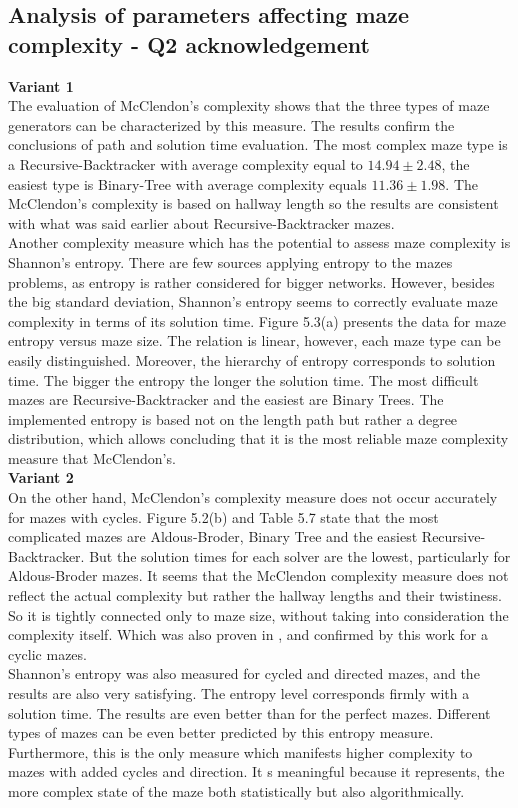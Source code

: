 \subsection{Analysis of parameters affecting maze complexity - Q2 acknowledgement}
\textbf{Variant 1}\\
\indent The evaluation of McClendon's complexity shows that the three types of maze generators can be characterized by this measure. The results confirm the conclusions
of path and solution time evaluation. The most complex maze type is a Recursive-Backtracker with average complexity equal to $14.94 \pm 2.48$, the easiest type is 
Binary-Tree with average complexity equals $11.36 \pm 1.98$. The McClendon's complexity is based on hallway length so the results are consistent with what was said earlier about
Recursive-Backtracker mazes.\\
Another complexity measure which has the potential to assess maze complexity is Shannon's entropy. There are few sources applying entropy to the mazes problems,
as entropy is rather considered for bigger networks. However, besides the big standard deviation, Shannon's entropy seems to correctly evaluate maze complexity
in terms of its solution time. Figure 5.3(a) presents the data for maze entropy versus maze size. The relation is linear, however, each maze type can be easily distinguished.
Moreover, the hierarchy of entropy corresponds to solution time. The bigger the entropy the longer the solution time. The most difficult mazes are Recursive-Backtracker and 
the easiest are Binary Trees. The implemented entropy is based not on the length path but rather a degree distribution, which allows concluding that it is the most reliable 
maze complexity measure that McClendon's.\\
\textbf{Variant 2}\\
On the other hand, McClendon's complexity measure does not occur accurately for mazes with cycles. Figure 5.2(b) and Table 5.7 state that the most
complicated mazes are Aldous-Broder, Binary Tree and the easiest Recursive-Backtracker. But the solution times for each solver are the lowest, particularly for 
Aldous-Broder mazes. It seems that the McClendon complexity measure does not reflect the actual complexity but rather the hallway lengths and their twistiness. So it
is tightly connected only to maze size, without taking into consideration the complexity itself.
Which was also proven in \cite{4}, and confirmed by this work for a cyclic mazes.\\
Shannon's entropy was also measured for cycled and directed mazes, and the results are also very satisfying. The entropy level corresponds firmly with a solution time.
The results are even better than for the perfect mazes. Different types of mazes can be even better predicted by this entropy measure.
Furthermore, this is the only measure which manifests higher complexity to mazes with added cycles and direction. It s meaningful because it represents, the 
more complex state of the maze both statistically but also algorithmically.
